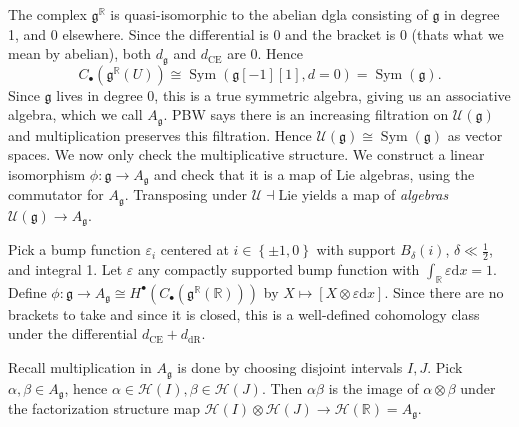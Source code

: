 
The complex $\mathfrak{g} ^\mathbb{R}$ is quasi-isomorphic to the abelian dgla consisting of $\mathfrak{g} $ in degree 1, and 0 elsewhere. Since the differential is 0 and the bracket is 0 (thats what we mean by abelian), both $d_\mathfrak{g} $ and $d_{\mathrm{CE} } $ are 0. Hence
\[
	C_{\bullet} (\mathfrak{g} ^\mathbb{R} (U))\cong \operatorname{Sym} (\mathfrak{g} [-1][1],d=0) = \operatorname{Sym} (\mathfrak{g} )
.\]
Since $\mathfrak{g} $ lives in degree 0, this is a true symmetric algebra, giving us an associative algebra, which we call $A_\mathfrak{g} $. PBW says there is an increasing filtration on $\mathcal{U} (\mathfrak{g} )$ and multiplication preserves this filtration. Hence $\mathcal{U} (\mathfrak{g} ) \cong \operatorname{Sym} (\mathfrak{g} )$ as vector spaces. We now only check the multiplicative structure. We construct a linear isomorphism $\phi : \mathfrak{g}  \to A_\mathfrak{g} $ and check that it is a map of Lie algebras, using the commutator for $A_\mathfrak{g} $. Transposing under $\mathcal{U} \dashv \mathrm{Lie} $ yields a map of \emph{algebras} $\mathcal{U} (\mathfrak{g} ) \to A_\mathfrak{g} $.

Pick a bump function $\varepsilon _i$ centered at $i\in \left\{ \pm1,0 \right\} $ with support $B_{\delta } (i)$, $\delta \ll \frac{1}{2} $, and integral 1. Let $\varepsilon $ any compactly supported bump function with $\int_\mathbb{R} \varepsilon \mathrm{d} x =1$. Define $\phi : \mathfrak{g}  \to A_\mathfrak{g}\cong H^{\bullet} (C_{\bullet} (\mathfrak{g} ^\mathbb{R} (\mathbb{R} ))) $ by $X\mapsto [X\otimes \varepsilon \mathrm{d} x]$. Since there are no brackets to take and since it is closed, this is a well-defined cohomology class under the differential $d_{\mathrm{CE} } +d_{\mathrm{dR} } $.

Recall multiplication in $A_\mathfrak{g} $ is done by choosing disjoint intervals $I,J$. Pick $\alpha ,\beta \in A_\mathfrak{g} $, hence $\alpha \in \mathcal{H} (I),\beta \in \mathcal{H} (J)$. Then $\alpha \beta $ is the image of $\alpha \otimes \beta $ under the factorization structure map $\mathcal{H} (I)\otimes \mathcal{H} (J)\to \mathcal{H} (\mathbb{R} )=A_\mathfrak{g} $.


